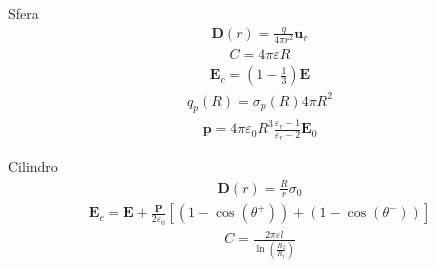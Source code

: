 \documentclass[10pt, twocolumn, a4paper, fleqn]{article}
\def\bb{\mathbf}
\def\e{\varepsilon}
\def\ke{{\varepsilon_r}}
\def\E{\bb{E}}
\def\P{\bb{P}}
\def\D{\bb{D}}
\def\u{\bb{u}}
\def\p{\bb{p}}
\begin{document}
Sfera
\begin{equation*}\begin{split}
\D\left(r\right)=\frac{q}{4\pi r^2}\u_r
\end{split}\end{equation*}
\begin{equation*}\begin{split}
C=4\pi\e R
\end{split}\end{equation*}
\begin{equation*}\begin{split}
\E_c=\left(1-\frac{1}{3}\right)\E
\end{split}\end{equation*}
\begin{equation*}\begin{split}
q_p\left(R\right)=\sigma_p\left(R\right)4\pi R^2
\end{split}\end{equation*}
\begin{equation*}\begin{split}
\p=4\pi\e_0R^3\frac{\ke-1}{\ke-2}\E_0
\end{split}\end{equation*}

Cilindro
\begin{equation*}\begin{split}
\D\left(r\right)=\frac{R}{r}\sigma_0
\end{split}\end{equation*}
\begin{equation*}\begin{split}
\E_c=\E+\frac{\P}{2\e_0}\left[\left(1-\cos{\left(\theta^+\right)}\right)+\left(1-\cos{\left(\theta^-\right)}\right)\right]
\end{split}\end{equation*}
\begin{equation*}\begin{split}
C=\frac{2\pi\e l}{\ln{\left(\frac{R_2}{R_1}\right)}}
\end{split}\end{equation*}
\end{document}
